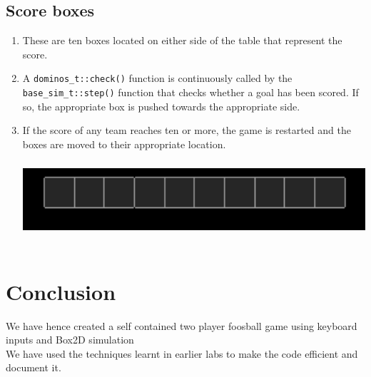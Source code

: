 \documentclass{article}
\begin{document}
\subsection{Score boxes}
\begin{enumerate}
\item These are ten boxes located on either side of the table that represent the score.

\item A \texttt{dominos\_t::check()} function is continuously called by the \texttt{base\_sim\_t::step()} function that checks whether a goal has been scored. If so, the appropriate box is pushed towards the appropriate side.

\item If the score of any team reaches ten or more, the game is restarted and the boxes are moved to their appropriate location.\\
\includegraphics[width=400pt,height=100pt]{Scores}
\end{enumerate}

\section{Conclusion}
We have hence created a self contained two player foosball game using keyboard inputs and Box2D simulation\\
We have used the techniques learnt in earlier labs to make the code efficient and document it. \\


\end{document}
